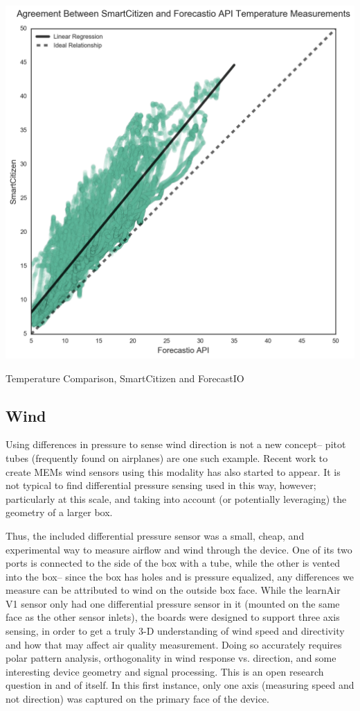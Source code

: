 \begin{marginfigure}[3.5cm]
 	\includegraphics[width=\textwidth]{figs/temp_forecastio_v_sck}               
 	 \caption{Temperature Comparison, SmartCitizen and ForecastIO}
  	\label{fig:temp_forecastio_v_sck}
\end{marginfigure}

\subsection{Wind}
\FloatBarrier

Using differences in pressure to sense wind direction is not a new concept-- pitot tubes (frequently found on airplanes) are one such example.  Recent work to create MEMs wind sensors using this modality has also started to appear. \cite{wind}  It is not typical to find differential pressure sensing used in this way, however; particularly at this scale, and taking into account (or potentially leveraging) the geometry of a larger box.

Thus, the included differential pressure sensor was a small, cheap, and experimental way to measure airflow and wind through the device.  One of its two ports is connected to the side of the box with a tube, while the other is vented into the box-- since the box has holes and is pressure equalized, any differences we measure can be attributed to wind on the outside box face.  While the learnAir V1 sensor only had one differential pressure sensor in it (mounted on the same face as the other sensor inlets), the boards were designed to support three axis sensing, in order to get a truly 3-D understanding of wind speed and directivity and how that may affect air quality measurement.  Doing so accurately requires polar pattern analysis, orthogonality in wind response vs. direction, and some interesting device geometry and signal processing.  This is an open research question in and of itself.  In this first instance, only one axis (measuring speed and not direction) was captured on the primary face of the device.

